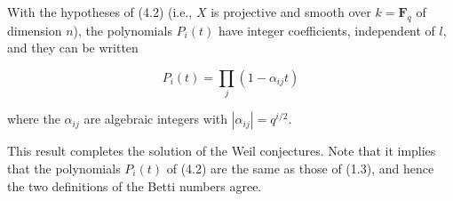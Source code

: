 With the hypotheses of (4.2) (i.e., $X$ is projective and smooth over $k = \mathbf{F}_q$ of dimension $n$), the polynomials $P_i(t)$ have integer coefficients, independent of $l$, and they can be written

$$P_i(t) = \prod_j (1 - \alpha_{ij} t)$$

where the $\alpha_{ij}$ are algebraic integers with $|\alpha_{ij}| = q^{i/2}$.

This result completes the solution of the Weil conjectures. Note that it implies that the polynomials $P_i(t)$ of (4.2) are the same as those of (1.3), and hence the two definitions of the Betti numbers agree.